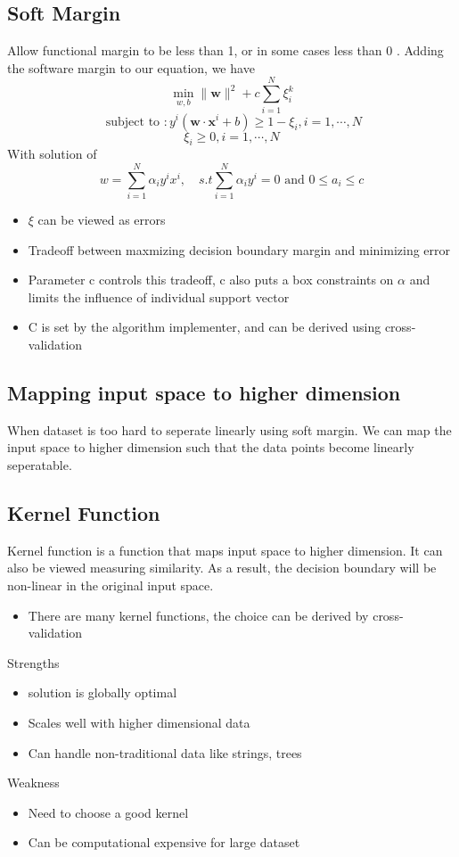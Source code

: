 \documentclass[11pt]{article}
\begin{document}
\subsection{Soft Margin}
\label{sec:orgc87ed8a}
Allow functional margin to be less than 1, or in some cases less than 0 . Adding the software margin to our equation, we have
$$ \min _ { w ,b } \| \mathbf { w } \| ^ { 2} + c \sum _ { i = 1} ^ { N } \xi _ { i } ^ { k } $$
$$
\text{ subject to } : y ^ { i } \left( \mathbf { w } \cdot \mathbf { x } ^ { i } + b \right) \geq 1- \xi _ { i } ,i = 1,\cdots ,N
$$
$$
\xi _ { i } \geq 0,i = 1,\cdots ,N
$$
With solution of 
$$
w = \sum _ { i = 1} ^ { N } \alpha _ { i } y ^ { i } x ^ { i } ,\quad s .t \sum _ { i = 1} ^ { N } \alpha _ { i } y ^ { i } = 0\text{ and } 0\leq a _ { i } \leq c
$$
\begin{itemize}
\item \(\xi\) can be viewed as errors
\item Tradeoff between maxmizing decision boundary margin and minimizing error
\item Parameter c controls this tradeoff, c also puts a box constraints on \(\alpha\) and limits the influence of individual support vector
\item C is set by the algorithm implementer, and can be derived using cross-validation
\end{itemize}
\subsection{Mapping input space to higher dimension}
\label{sec:orgf54963d}
When dataset is too hard to seperate linearly using soft margin. We can map the input space to higher dimension such that the data points become linearly seperatable.
\subsection{Kernel Function}
\label{sec:orgb69172f}
Kernel function is a function that maps input space to higher dimension. It can also be viewed measuring similarity. As a result, the decision boundary will be non-linear in the original input space.
\begin{itemize}
\item There are many kernel functions, the choice can be derived by cross-validation
\end{itemize}
Strengths
\begin{itemize}
\item solution is globally optimal
\item Scales well with higher dimensional data
\item Can handle non-traditional data like strings, trees
\end{itemize}
Weakness
\begin{itemize}
\item Need to choose a good kernel
\item Can be computational expensive for large dataset
\end{itemize}
\end{document}
